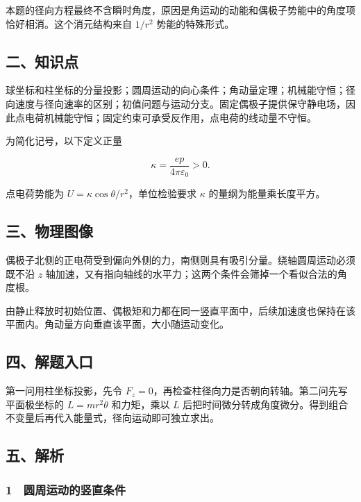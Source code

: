 \documentclass[12pt,a4paper,fontset=fandol]{ctexart}
\begin{document}
本题的径向方程最终不含瞬时角度，原因是角运动的动能和偶极子势能中的角度项恰好相消。这个消元结构来自
\(1/r^2\) 势能的特殊形式。

\subsection{二、知识点}\label{ux4e8cux77e5ux8bc6ux70b9-4}

球坐标和柱坐标的分量投影；圆周运动的向心条件；角动量定理；机械能守恒；径向速度与径向速率的区别；初值问题与运动分支。固定偶极子提供保守静电场，因此点电荷机械能守恒；固定约束可承受反作用，点电荷的线动量不守恒。

为简化记号，以下定义正量

\[\kappa=\frac{ep}{4\pi\varepsilon_0}>0.\]

点电荷势能为 \(U=\kappa\cos\theta/r^2\)，单位检验要求 \(\kappa\)
的量纲为能量乘长度平方。

\subsection{三、物理图像}\label{ux4e09ux7269ux7406ux56feux50cf-4}

偶极子北侧的正电荷受到偏向外侧的力，南侧则具有吸引分量。绕轴圆周运动必须既不沿
\(z\)
轴加速，又有指向轴线的水平力；这两个条件会筛掉一个看似合法的角度根。

由静止释放时初始位置、偶极矩和力都在同一竖直平面中，后续加速度也保持在该平面内。角动量方向垂直该平面，大小随运动变化。

\subsection{四、解题入口}\label{ux56dbux89e3ux9898ux5165ux53e3-4}

第一问用柱坐标投影，先令
\(F_z=0\)，再检查柱径向力是否朝向转轴。第二问先写平面极坐标的
\(L=mr^2\dot\theta\) 和力矩，乘以 \(L\)
后把时间微分转成角度微分。得到组合不变量后再代入能量式，径向运动即可独立求出。

\subsection{五、解析}\label{ux4e94ux89e3ux6790-4}

\subsubsection{1　圆周运动的竖直条件}\label{ux5706ux5468ux8fd0ux52a8ux7684ux7ad6ux76f4ux6761ux4ef6}
\end{document}
